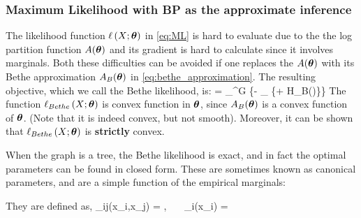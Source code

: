 \subsubsection{Maximum Likelihood with BP as the approximate inference}
\label{sec:Bethe_ML}
The likelihood function $\ell\left(X;\boldsymbol{\theta}\right)$ in \eqref{eq:ML} is hard to evaluate due to the the log partition function $A(\boldsymbol{\theta})$ and its gradient is hard to calculate since it involves marginals.
Both these difficulties can be avoided if one replaces the $A(\boldsymbol{\theta})$ with its Bethe approximation $A_B(\boldsymbol{\theta})$ in \eqref{eq:bethe_approximation}.
The resulting objective, which we call the Bethe likelihood, is:
\be
\label{eq:bethe_like}
  = \sup_{\thetav \in \Omega^G} \left\{\mubv \cdot \thetav - \sup_{\tauv \in \lclmargpoly} \left\{\tauv \cdot \thetav + H_B(\tauv)\right\}\right\}
\ee
The function $\ell_{Bethe}\left(X;\boldsymbol{\theta}\right)$ is convex function in $\boldsymbol{\theta}$, since $A_B(\boldsymbol{\theta})$ is a convex function of $\boldsymbol{\theta}$. (Note that it is indeed convex, but not smooth). 
Moreover, it can be shown that $\ell_{Bethe}\left(X; \boldsymbol{\theta}\right)$ is \textbf{strictly} convex. %


When the graph is a tree, the Bethe likelihood is exact, and in fact the optimal parameters can be found in closed form.
These are sometimes known as canonical parameters, and are a simple function of the empirical marginals:

They are defined as,
\be
\label{eq:canonical}
\theta_{ij}(x_i,x_j) = , \ \ \ \theta_i(x_i) = 
\ee

